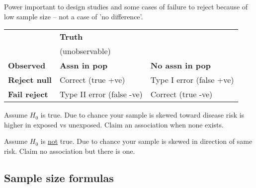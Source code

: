 \documentclass[landscape]{article}
\newcommand{\squeezeup}{\vspace{-5mm}}
\newcommand{\squeezeupp}{\vspace{-2mm}}
\begin{document}
\begin{multicols}{3}
	\squeezeupp{}
	Power important to design studies and some cases of failure to reject because of low sample size -- not a case of 'no difference'.
	
	\squeezeup{}
		\begin{center}
    \begin{tabular}{p{1.8cm}|p{3cm}|p{3cm}}
						& \textbf{Truth} & \textbf{} \\ 
						& (unobservable) & \\
						\textbf{Observed}    & \textbf{Assn in pop} & \textbf{No assn in pop} \\  \hline
						\textbf{Reject null} & Correct (true +ve) & Type I error (false +ve) \\ \hline
						\textbf{Fail reject} & Type II error (false -ve) & Correct (true -ve) \\ 
    \end{tabular}%
		\end{center}
		
		\begin{description}
			\item[Type I error (alpha)] Assume $H_{0}$ is true. Due to chance your sample is skewed toward disease risk is higher in exposed vs unexposed. Claim an association when none exists.
			\item[Type II error (beta)] Assume $H_{0}$ is \underline{not} true. Due to chance your sample is skewed in direction of same risk. Claim no association but there is one.
		\end{description}

	\squeezeupp{}
	\subsection{Sample size formulas}


\end{multicols}
\end{document}
